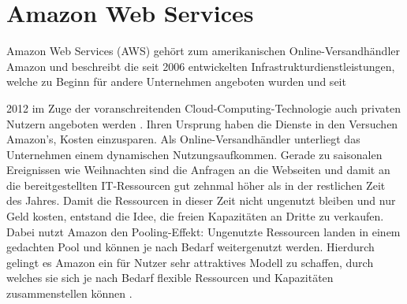 \chapter{Amazon Web Services}\label{chapter:kapitellabel} %
Amazon Web Services (AWS) gehört zum amerikanischen Online-Versandhändler Amazon und beschreibt die
seit 2006 entwickelten Infrastrukturdienstleistungen, welche zu Beginn für andere Unternehmen angeboten
wurden und seit {{\color{red}2012 im Zuge der voranschreitenden Cloud-Computing-Technologie auch
privaten Nutzern angeboten werden} \cite{aws:general}. Ihren Ursprung haben die Dienste in den Versuchen Amazon's, Kosten einzusparen. Als Online-Versandhändler unterliegt das Unternehmen einem dynamischen
Nutzungsaufkommen. Gerade zu saisonalen Ereignissen wie Weihnachten sind die Anfragen
an die Webseiten und damit an die bereitgestellten IT-Ressourcen gut zehnmal höher als
in der restlichen Zeit des Jahres. Damit die Ressourcen in dieser Zeit nicht ungenutzt
bleiben und nur Geld kosten, entstand die Idee, die freien Kapazitäten an Dritte zu verkaufen.
Dabei nutzt Amazon den Pooling-Effekt: Ungenutzte Ressourcen landen in einem gedachten Pool und
können je nach Bedarf weitergenutzt werden. Hierdurch gelingt es Amazon ein für Nutzer
sehr attraktives Modell zu schaffen, durch welches sie sich je nach Bedarf flexible
Ressourcen und Kapazitäten zusammenstellen können \cite{baun:cloudcomp}.

}
